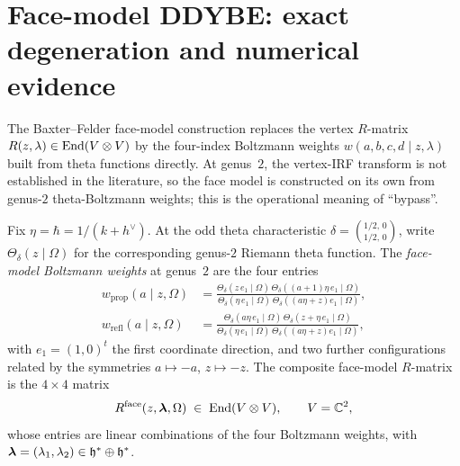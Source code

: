 \section{Face-model DDYBE: exact degeneration and numerical evidence}
\label{sec:g2-face-model-bypass}

The Baxter--Felder face-model construction replaces the
vertex $R$-matrix $R(z,\lambda)\in\mathrm{End}(V\otimes V)$ by the
four-index Boltzmann weights
$w(a,b,c,d\mid z, \lambda)$ built from theta functions
directly. At genus~$2$, the vertex-IRF transform is not
established in the literature, so the face model is
constructed on its own from genus-$2$ theta-Boltzmann weights;
this is the operational meaning of ``bypass''.

\begin{definition}
\label{def:g2-face-boltzmann}
Fix $\eta=\hbar=1/(k+h^\vee)$. At the odd theta characteristic
$\delta=({}^{1/2,\,0}_{1/2,\,0})$, write
$\Theta_\delta(z\mid\Omega)$ for the corresponding genus-$2$
Riemann theta function. The \emph{face-model Boltzmann
weights} at genus~$2$ are the four entries
\begin{equation}\label{eq:g2-boltzmann}
\begin{split}
 w_{\text{prop}}(a\mid z,\Omega)
 &=
 \frac{\Theta_\delta(z\,e_1\mid\Omega)\,\Theta_\delta((a+1)\eta\,e_1\mid\Omega)}
 {\Theta_\delta(\eta\,e_1\mid\Omega)\,\Theta_\delta((a\eta+z)e_1\mid\Omega)}, \\
 w_{\text{refl}}(a\mid z,\Omega)
 &=
 \frac{\Theta_\delta(a\eta\,e_1\mid\Omega)\,\Theta_\delta(z+\eta\,e_1\mid\Omega)}
 {\Theta_\delta(\eta\,e_1\mid\Omega)\,\Theta_\delta((a\eta+z)e_1\mid\Omega)},
\end{split}
\end{equation}
with $e_1=(1,0)^t$ the first coordinate direction, and two
further configurations related by the symmetries
$a\mapsto -a$, $z\mapsto -z$. The composite face-model
$R$-matrix is the $4\times 4$ matrix
\begin{equation}\label{eq:g2-face-R}
 R^{\mathrm{face}}(z,\boldsymbol\lambda,\Omega)
 \;\in\; \mathrm{End}(V\otimes V),
 \qquad V=\mathbb{C}^2,
\end{equation}
whose entries are linear combinations of
the four Boltzmann weights, with
$\boldsymbol\lambda=(\lambda_1,\lambda_2)\in\mathfrak{h}^*\oplus\mathfrak{h}^*$.
\end{definition}

